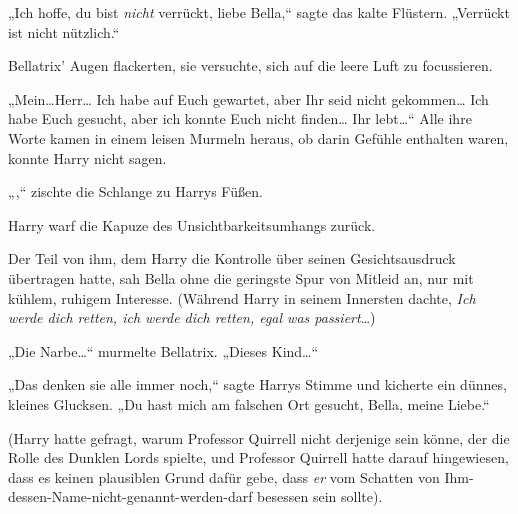„Ich hoffe, du bist \emph{nicht} verrückt, liebe Bella,“ sagte das kalte Flüstern. „Verrückt ist nicht nützlich.“

Bellatrix' Augen flackerten, sie versuchte, sich auf die leere Luft zu focussieren.

„Mein…Herr… Ich habe auf Euch gewartet, aber Ihr seid nicht gekommen… Ich habe Euch gesucht, aber ich konnte Euch nicht finden… Ihr lebt…“ Alle ihre Worte kamen in einem leisen Murmeln heraus, ob darin Gefühle enthalten waren, konnte Harry nicht sagen.

„,“ zischte die Schlange zu Harrys Füßen.

Harry warf die Kapuze des Unsichtbarkeitsumhangs zurück.

Der Teil von ihm, dem Harry die Kontrolle über seinen Gesichtsausdruck übertragen hatte, sah Bella ohne die geringste Spur von Mitleid an, nur mit kühlem, ruhigem Interesse. (Während Harry in seinem Innersten dachte, \emph{Ich werde dich retten, ich werde dich retten, egal was passiert}…)

„Die Narbe…“ murmelte Bellatrix. „Dieses Kind…“

„Das denken sie alle immer noch,“ sagte Harrys Stimme und kicherte ein dünnes, kleines Glucksen. „Du hast mich am falschen Ort gesucht, Bella, meine Liebe.“

(Harry hatte gefragt, warum Professor Quirrell nicht derjenige sein könne, der die Rolle des Dunklen Lords spielte, und Professor Quirrell hatte darauf hingewiesen, dass es keinen plausiblen Grund dafür gebe, dass \emph{er} vom Schatten von Ihm-dessen-Name-nicht-genannt-werden-darf besessen sein sollte).

